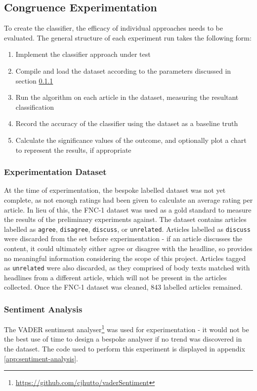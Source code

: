 \subsection{Congruence Experimentation}\label{experimentation}
To create the classifier, the efficacy of individual approaches needs to be evaluated. The general structure of each experiment run takes the following form:

\begin{enumerate}
	\item Implement the classifier approach under test
	\item Compile and load the dataset according to the parameters discussed in section \ref{experimentation-data}
	\item Run the algorithm on each article in the dataset, measuring the resultant classification
	\item Record the accuracy of the classifier using the dataset as a baseline truth
	\item Calculate the significance	values of the outcome, and optionally plot a chart to represent the results, if appropriate
\end{enumerate}

\subsubsection{Experimentation Dataset}\label{experimentation-data}
At the time of experimentation, the bespoke labelled dataset was not yet complete, as not enough ratings had been given to calculate an average rating per article. In lieu of this, the FNC-1 dataset was used as a gold standard to measure the results of the preliminary experiments against. The dataset contains articles labelled as \texttt{agree}, \texttt{disagree}, \texttt{discuss}, or \texttt{unrelated}. Articles labelled as \texttt{discuss} were discarded from the set before experimentation - if an article discusses the content, it could ultimately either agree or disagree with the headline, so provides no meaningful information considering the scope of this project. Articles tagged as \texttt{unrelated} were also discarded, as they comprised of body texts matched with headlines from a different article, which will not be present in the articles collected. Once the FNC-1 dataset was cleaned, 843 labelled articles remained.


\subsubsection{Sentiment Analysis}
The VADER sentiment analyser\footnote{\url{https://github.com/cjhutto/vaderSentiment}} was used for experimentation - it would not be the best use of time to design a bespoke analyser if no trend was discovered in the dataset. The code used to perform this experiment is displayed in appendix \ref{app:sentiment-analysis}.



